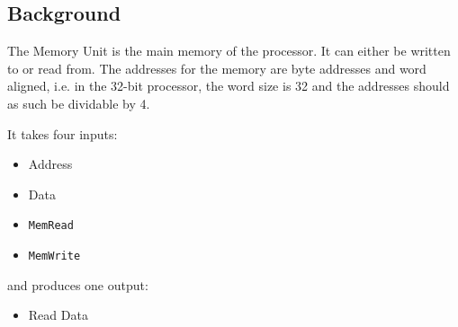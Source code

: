 \documentclass{beamer}
\begin{document}
\subsection{Background}
\begin{frame}
    The Memory Unit is the main memory of the processor. It can either be
    written to or read from. The addresses for the memory are byte addresses
    and word aligned, i.e. in the 32-bit processor, the word size is 32 and the
    addresses should as such be dividable by 4.

    \vspace{\baselineskip}
    It takes four inputs:
    \begin{itemize}
        \item Address
        \item Data
        \item \texttt{MemRead}
        \item \texttt{MemWrite}
    \end{itemize}
    and produces one output:
    \begin{itemize}
        \item Read Data
    \end{itemize}
\end{frame}
\begin{frame}
    \begin{figure}
    \end{figure}
\end{frame}
\end{document}
